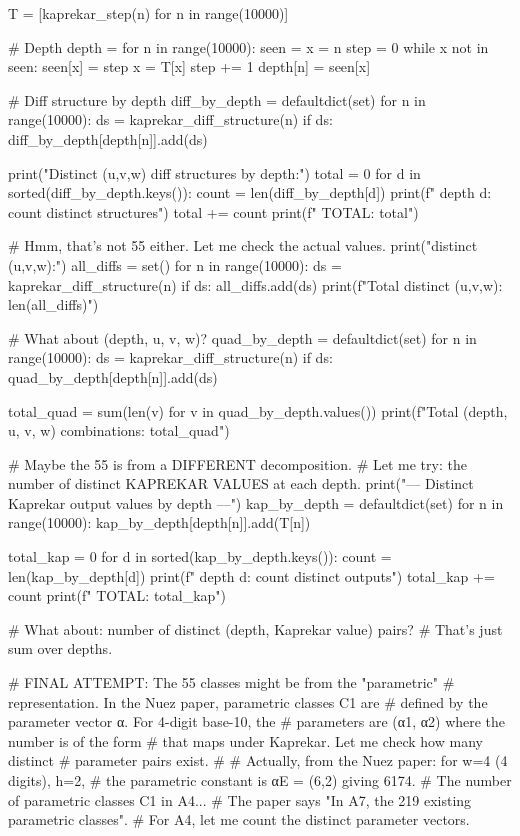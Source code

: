 {{{{{{{{{{{{{T = [kaprekar_step(n) for n in range(10000)]

# Depth
depth = {}
for n in range(10000):
    seen = {}
    x = n
    step = 0
    while x not in seen:
        seen[x] = step
        x = T[x]
        step += 1
    depth[n] = seen[x]

# Diff structure by depth
diff_by_depth = defaultdict(set)
for n in range(10000):
    ds = kaprekar_diff_structure(n)
    if ds:
        diff_by_depth[depth[n]].add(ds)

print("Distinct (u,v,w) diff structures by depth:")
total = 0
for d in sorted(diff_by_depth.keys()):
    count = len(diff_by_depth[d])
    print(f"  depth {d}: {count} distinct structures")
    total += count
print(f"  TOTAL: {total}")

# Hmm, that's not 55 either. Let me check the actual values.
print("\nAll distinct (u,v,w):")
all_diffs = set()
for n in range(10000):
    ds = kaprekar_diff_structure(n)
    if ds:
        all_diffs.add(ds)
print(f"Total distinct (u,v,w): {len(all_diffs)}")

# What about (depth, u, v, w)?
quad_by_depth = defaultdict(set)
for n in range(10000):
    ds = kaprekar_diff_structure(n)
    if ds:
        quad_by_depth[depth[n]].add(ds)

total_quad = sum(len(v) for v in quad_by_depth.values())
print(f"Total (depth, u, v, w) combinations: {total_quad}")

# Maybe the 55 is from a DIFFERENT decomposition.
# Let me try: the number of distinct KAPREKAR VALUES at each depth.
print("\n--- Distinct Kaprekar output values by depth ---")
kap_by_depth = defaultdict(set)
for n in range(10000):
    kap_by_depth[depth[n]].add(T[n])

total_kap = 0
for d in sorted(kap_by_depth.keys()):
    count = len(kap_by_depth[d])
    print(f"  depth {d}: {count} distinct outputs")
    total_kap += count
print(f"  TOTAL: {total_kap}")

# What about: number of distinct (depth, Kaprekar value) pairs?
# That's just sum over depths.

# FINAL ATTEMPT: The 55 classes might be from the "parametric"
# representation. In the Nuez paper, parametric classes C1 are
# defined by the parameter vector α. For 4-digit base-10, the
# parameters are (α1, α2) where the number is of the form
# that maps under Kaprekar. Let me check how many distinct
# parameter pairs exist.
#
# Actually, from the Nuez paper: for w=4 (4 digits), h=2,
# the parametric constant is αE = (6,2) giving 6174.
# The number of parametric classes C1 in A4...
# The paper says "In A7, the 219 existing parametric classes".
# For A4, let me count the distinct parameter vectors.

}}}}}}}}}}}}}

